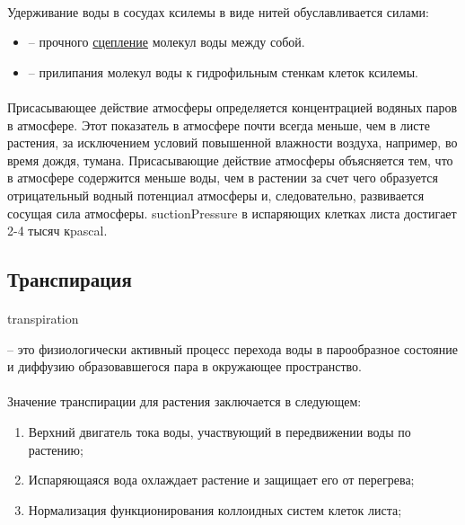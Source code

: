 \paragraph*{}Удерживание воды в сосудах ксилемы в виде нитей обуславливается силами:

\begin{itemize}

\item {} -- прочного \hyperlink{question_water_mol}{сцепление} молекул воды между собой.
\item {} -- прилипания молекул воды к гидрофильным стенкам клеток ксилемы.

\end{itemize}

\paragraph*{}Присасывающее действие атмосферы определяется концентрацией водяных паров в атмосфере. Этот показатель в атмосфере почти всегда меньше, чем в листе растения, за исключением условий повышенной влажности воздуха, например, во время дождя, тумана. Присасывающие действие атмосферы объясняется тем, что в атмосфере содержится меньше воды, чем в растении за счет чего образуется отрицательный водный потенциал атмосферы и, следовательно, развивается сосущая сила атмосферы. \gls{suctionPressure} в испаряющих клетках листа достигает 2-4 тысяч к\gls{pascal}.

\subsection*{Транспирация}

\paragraph*{}\hypertarget{transpiration}{\gls{transpiration}} -- это физиологически активный процесс перехода воды в парообразное состояние и диффузию образовавшегося пара в окружающее пространство.

\paragraph*{}Значение транспирации для растения заключается в следующем:

\begin{enumerate}

\item Верхний двигатель тока воды, участвующий в передвижении воды по растению;
\item Испаряющаяся вода охлаждает растение и защищает его от перегрева;
\item Нормализация функционирования коллоидных систем клеток листа;

\end{enumerate}

